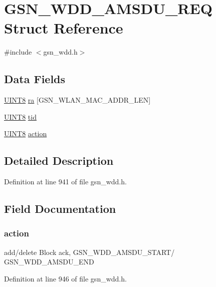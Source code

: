 \hypertarget{a00270}{
\section{GSN\_\-WDD\_\-AMSDU\_\-REQ Struct Reference}
\label{a00270}
}


{\ttfamily \#include $<$gsn\_\-wdd.h$>$}

\subsection*{Data Fields}
\begin{DoxyCompactItemize}
\item 
\hyperlink{a00660_gab27e9918b538ce9d8ca692479b375b6a}{UINT8} \hyperlink{a00270_a1d97eb2e070b4a95218b41f6abbff9d7}{ra} \mbox{[}GSN\_\-WLAN\_\-MAC\_\-ADDR\_\-LEN\mbox{]}
\item 
\hyperlink{a00660_gab27e9918b538ce9d8ca692479b375b6a}{UINT8} \hyperlink{a00270_abf69ed815c8482f9995e41bc0aff9043}{tid}
\item 
\hyperlink{a00660_gab27e9918b538ce9d8ca692479b375b6a}{UINT8} \hyperlink{a00270_ac1731c03e4e0dbe0c25f3a606a77df7e}{action}
\end{DoxyCompactItemize}


\subsection{Detailed Description}


Definition at line 941 of file gsn\_\-wdd.h.



\subsection{Field Documentation}
\hypertarget{a00270_ac1731c03e4e0dbe0c25f3a606a77df7e}{
\subsubsection[{action}]{ {\bf action}}}
\label{a00270_ac1731c03e4e0dbe0c25f3a606a77df7e}
add/delete Block ack, GSN\_\-WDD\_\-AMSDU\_\-START/ GSN\_\-WDD\_\-AMSDU\_\-END 

Definition at line 946 of file gsn\_\-wdd.h.


